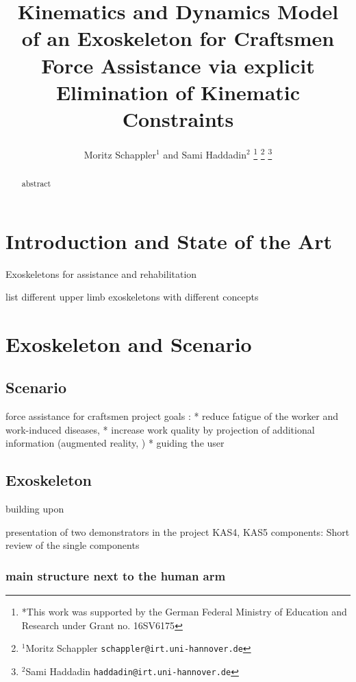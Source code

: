 \documentclass[letterpaper, 10 pt, conference]{ieeeconf}  %
\title{\LARGE \bf
Kinematics and Dynamics Model of an Exoskeleton for Craftsmen Force Assistance via explicit Elimination of Kinematic Constraints
}
\author{Moritz Schappler$^{1}$ and Sami Haddadin$^{2}$%
\thanks{*This work was supported by the German Federal Ministry of Education and Research under Grant no. 16SV6175}%
\thanks{$^{1}$Moritz Schappler
        {\tt\small schappler@irt.uni-hannover.de}}%
\thanks{$^{2}$Sami Haddadin
        {\tt\small haddadin@irt.uni-hannover.de}}%
}
\begin{document}
\maketitle
\thispagestyle{empty}
\pagestyle{empty}


\begin{abstract}

abstract

\end{abstract}


\section{Introduction and State of the Art}

Exoskeletons for assistance and rehabilitation

list different upper limb exoskeletons with different concepts


\section{Exoskeleton and Scenario}

\subsection{Scenario}

force assistance for craftsmen
project goals \cite{NuelleSchTapLil2017}: 
* reduce fatigue of the worker and work-induced diseases, 
* increase work quality by projection of additional information (augmented reality, \cite{NuelleBriTapDem2018})
* guiding the user

\subsection{Exoskeleton}

building upon \cite{PetereitAlbJerSch2012}

presentation of two demonstrators in the project
KAS4, KAS5
components: Short review of the single components

\subsubsection{main structure next to the human arm}
\end{document}
